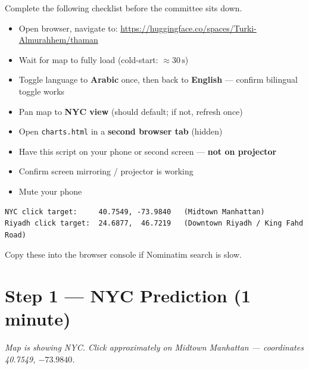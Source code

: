 \documentclass[11pt, a4paper, twoside]{article}
\begin{document}
Complete the following checklist before the committee sits down.

\begin{checkbox}
\begin{itemize}[leftmargin=2em,label=\(\square\)]
  \item Open browser, navigate to:
        \url{https://huggingface.co/spaces/Turki-Almurahhem/thaman}
  \item Wait for map to fully load (cold-start: $\approx 30\,\text{s}$)
  \item Toggle language to \textbf{Arabic} once, then back to \textbf{English}
        --- confirm bilingual toggle works
  \item Pan map to \textbf{NYC view} (should default; if not, refresh once)
  \item Open \texttt{charts.html} in a \textbf{second browser tab} (hidden)
  \item Have this script on your phone or second screen --- \textbf{not on projector}
  \item Confirm screen mirroring / projector is working
  \item Mute your phone
\end{itemize}
\end{checkbox}

\bigskip

\begin{tcolorbox}[colback=gray!5,colframe=gray!50,title=\textbf{Coordinates to have ready}]
\begin{lstlisting}
NYC click target:     40.7549, -73.9840   (Midtown Manhattan)
Riyadh click target:  24.6877,  46.7219   (Downtown Riyadh / King Fahd Road)
\end{lstlisting}
Copy these into the browser console if Nominatim search is slow.
\end{tcolorbox}

\section{Step 1 --- NYC Prediction (1 minute)}
\label{sec:nyc}

\noindent\textit{Map is showing NYC. Click approximately on Midtown Manhattan
--- coordinates 40.7549, $-73.9840$.}
\end{document}

